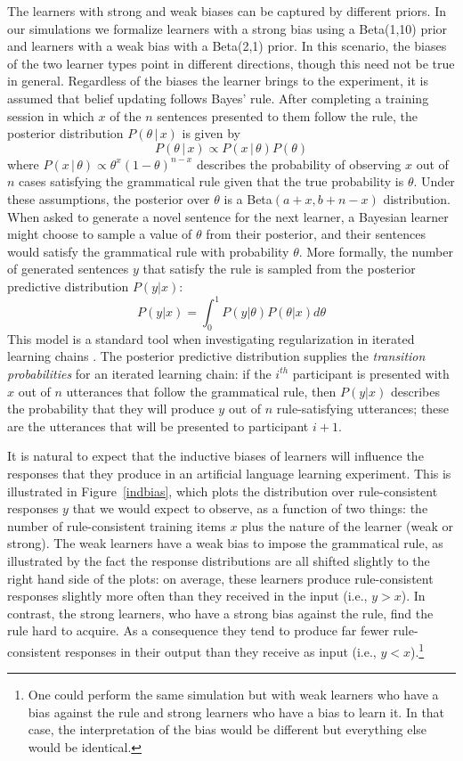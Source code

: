 \documentclass[doc]{apa6}
\newcommand{\given}{\, | \,}
\begin{document}
The learners with {\sc strong} and {\sc weak} biases can be captured by different priors. In our simulations we formalize learners with a {\sc strong} bias using a Beta(1,10) prior and learners with a {\sc weak} bias with a Beta(2,1) prior. In this scenario, the biases of the two learner types point in different directions, though this need not be true in general.  Regardless of the biases the learner brings to the experiment, it is assumed that belief updating follows Bayes' rule. After completing a training session in which $x$ of the $n$ sentences presented to them follow the rule, the posterior distribution $P(\theta \given x)$ is given by
$$
P(\theta \given x) \propto P(x \given \theta) P(\theta)
$$
where $P(x \given \theta) \propto \theta^x (1-\theta)^{n-x}$ describes the probability of observing $x$ out of $n$ cases satisfying the grammatical rule given that the true probability is $\theta$. Under these assumptions, the posterior over $\theta$ is a Beta$(a+x,b+n-x)$ distribution. When asked to generate a novel sentence for the next learner, a Bayesian learner might choose to sample a value of $\theta$ from their posterior, and their sentences would satisfy the grammatical rule with probability $\theta$. More formally, the number of generated sentences $y$ that satisfy the rule is sampled from the posterior predictive distribution $P(y|x)$:
$$
P(y|x) = \int_0^1 P(y|\theta) P(\theta|x) d\theta
$$
This model is a standard tool when investigating regularization in iterated learning chains \parencite{realigriffiths09,ferdinandetal13}. The posterior predictive distribution supplies the {\it transition probabilities} for an iterated learning chain: if the $i^{th}$ participant is presented with $x$ out of $n$ utterances that follow the grammatical rule, then $P(y|x)$ describes the probability that they will produce $y$ out of $n$ rule-satisfying utterances; these are the utterances that will be presented to participant $i+1$.

It is natural to expect that the inductive biases of learners will influence the responses that they produce in an artificial language learning experiment. This is illustrated in Figure~\ref{indbias}, which plots the distribution over rule-consistent responses $y$ that we would expect to observe, as a function of two things: the number of rule-consistent training items $x$ plus the nature of the learner ({\sc weak} or {\sc strong}). The {\sc weak} learners have a weak bias to impose the grammatical rule, as illustrated by the fact the response distributions are all shifted slightly to the right hand side of the plots: on average, these learners produce rule-consistent responses slightly more often than they received in the input (i.e., $y>x$). In contrast, the {\sc strong} learners, who have a strong bias against the rule, find the rule hard to acquire. As a consequence they tend to produce far fewer rule-consistent responses in their output than they receive as input (i.e., $y<x$).\footnote{One could perform the same simulation but with {\sc weak} learners who have a bias against the rule and {\sc strong} learners who have a bias to learn it. In that case, the interpretation of the bias would be different but everything else would be identical.}
\end{document}

